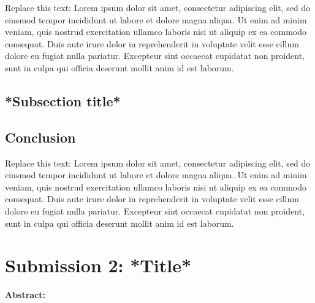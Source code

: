\documentclass[a4paper, 11pt]{article}
\begin{document}
Replace this text: Lorem ipsum dolor sit amet, consectetur adipiscing elit, sed do eiusmod tempor incididunt ut labore et dolore magna aliqua. Ut enim ad minim veniam, quis nostrud exercitation ullamco laboris nisi ut aliquip ex ea commodo consequat. Duis aute irure dolor in reprehenderit in voluptate velit esse cillum dolore eu fugiat nulla pariatur. Excepteur sint occaecat cupidatat non proident, sunt in culpa qui officia deserunt mollit anim id est laborum.


\vspace{0.5cm}
\subsection{*Subsection title*}



\vspace{0.5cm}
\subsection{Conclusion}

Replace this text: Lorem ipsum dolor sit amet, consectetur adipiscing elit, sed do eiusmod tempor incididunt ut labore et dolore magna aliqua. Ut enim ad minim veniam, quis nostrud exercitation ullamco laboris nisi ut aliquip ex ea commodo consequat. Duis aute irure dolor in reprehenderit in voluptate velit esse cillum dolore eu fugiat nulla pariatur. Excepteur sint occaecat cupidatat non proident, sunt in culpa qui officia deserunt mollit anim id est laborum.






\newpage
\section{Submission 2: *Title*}

\textbf{Abstract: }




\vspace{0.5cm}
\end{document}
